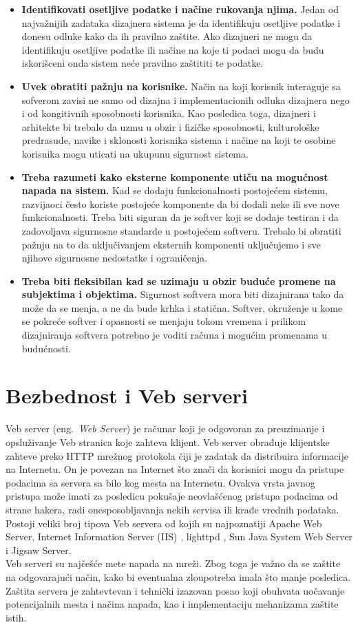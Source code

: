 \documentclass[a4paper]{article}
\begin{document}
\begin{itemize}
\item \textbf{Identifikovati osetljive podatke i načine rukovanja njima.}
    Jedan od najvažnijih zadataka dizajnera sistema je da identifikuju osetljive podatke i donesu odluke kako da ih pravilno zaštite. Ako dizajneri ne mogu da identifikuju osetljive podatke ili načine na koje ti podaci mogu da budu iskorišceni onda sistem neće pravilno zaštititi te podatke.
\item \textbf{Uvek obratiti pažnju na korisnike.}
    Način na koji korisnik interaguje sa sofverom zavisi ne samo od dizajna i implementacionih odluka dizajnera nego i od kongitivnih sposobnosti korisnika. Kao posledica toga, dizajneri i arhitekte bi trebalo da uzmu u obzir i fizičke sposobnosti, kulturološke predrasude, navike i sklonosti korisnika sistema i načine na koji te osobine korisnika mogu uticati na ukupunu sigurnost sistema.
\item \textbf{Treba razumeti kako eksterne komponente utiču na mogućnost napada na sistem.}
    Kad se dodaju funkcionalnosti postojećem sistemu, razvijaoci često koriste postojeće komponente da bi dodali neke ili sve nove funkcionalnosti. Treba biti siguran da je softver koji se dodaje testiran i da zadovoljava sigurnosne standarde u postojećem softveru. Trebalo bi obratiti pažnju na to da uključivanjem eksternih komponenti uključujemo i sve njihove sigurnosne nedostatke i ograničenja.
\item \textbf{Treba biti fleksibilan kad se uzimaju u obzir buduće promene na subjektima i objektima.}
    Sigurnost softvera mora biti dizajnirana tako da može da se menja, a ne da bude krhka i statična. Softver, okruženje u kome se pokreće softver i opasnosti se menjaju tokom vremena i prilikom dizajniranja softvera potrebno je voditi računa i mogućim promenama u budućnosti.
\end{itemize}

\section{Bezbednost i Veb serveri}
\label{sec:bezbednosni propusti prilikom implementacije Veb servera}

Veb server (eng.~{\em Web Server}) je računar koji je odgovoran za preuzimanje i opsluživanje Veb stranica koje zahteva klijent. Veb server obrađuje klijentske zahteve preko HTTP mrežnog protokola čiji je zadatak da distribuira informacije na Internetu. On je povezan na Internet što znači da korisnici mogu da pristupe podacima sa servera sa bilo kog mesta na Internetu. Ovakva vrsta javnog pristupa može imati za posledicu pokušaje neovlašćenog pristupa podacima od strane hakera, radi onesposobljavanja nekih servisa ili krađe vrednih podataka. Postoji veliki broj tipova Veb servera od kojih su najpoznatiji Apache Web Server, Internet Information Server (IIS) , lighttpd , Sun Java System Web Server i Jigsaw Server. \\
\indent Veb serveri su najčešće mete napada na mreži. Zbog toga je važno da se zaštite na odgovarajući način, kako bi eventualna zloupotreba imala što manje posledica. Zaštita servera je zahtevtevan i tehnički izazovan posao koji obuhvata uočavanje potencijalnih mesta i načina napada, kao  i implementaciju mehanizama zaštite istih.  
\end{document}

